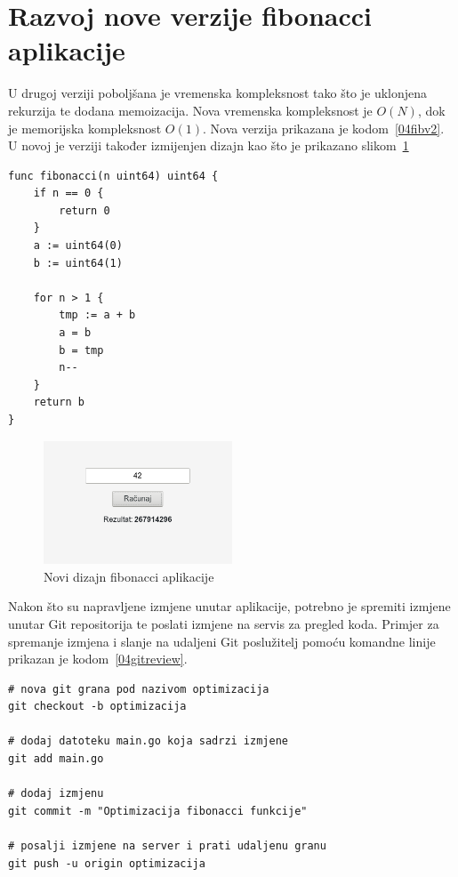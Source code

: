 \section{Razvoj nove verzije fibonacci aplikacije}
U drugoj verziji poboljšana je vremenska kompleksnost tako što je uklonjena rekurzija te dodana
memoizacija. Nova vremenska kompleksnost je $O(N)$, dok je memorijska kompleksnost $O(1)$. Nova
verzija prikazana je kodom~\ref{04fibv2}. U novoj je verziji također izmijenjen dizajn kao što je
prikazano slikom~\ref{fig:04redesign}

\begin{lstlisting}[float=h]
func fibonacci(n uint64) uint64 {
	if n == 0 {
		return 0
	}
	a := uint64(0)
	b := uint64(1)

	for n > 1 {
		tmp := a + b
		a = b
		b = tmp
		n--
	}
	return b
}
\end{lstlisting}

\begin{figure}[h]
    \centering
    \includegraphics[width=0.5\textwidth]{img/04/new_app.png}
    \caption{Novi dizajn fibonacci aplikacije}%
    \label{fig:04redesign}
\end{figure}

Nakon što su napravljene izmjene unutar aplikacije, potrebno je spremiti izmjene unutar Git
repositorija te poslati izmjene na servis za pregled koda. Primjer za spremanje izmjena i slanje na
udaljeni Git poslužitelj pomoću komandne linije prikazan je kodom~\ref{04gitreview}.

\begin{lstlisting}[float=h]
# nova git grana pod nazivom optimizacija
git checkout -b optimizacija

# dodaj datoteku main.go koja sadrzi izmjene
git add main.go

# dodaj izmjenu
git commit -m "Optimizacija fibonacci funkcije"

# posalji izmjene na server i prati udaljenu granu
git push -u origin optimizacija
\end{lstlisting}

